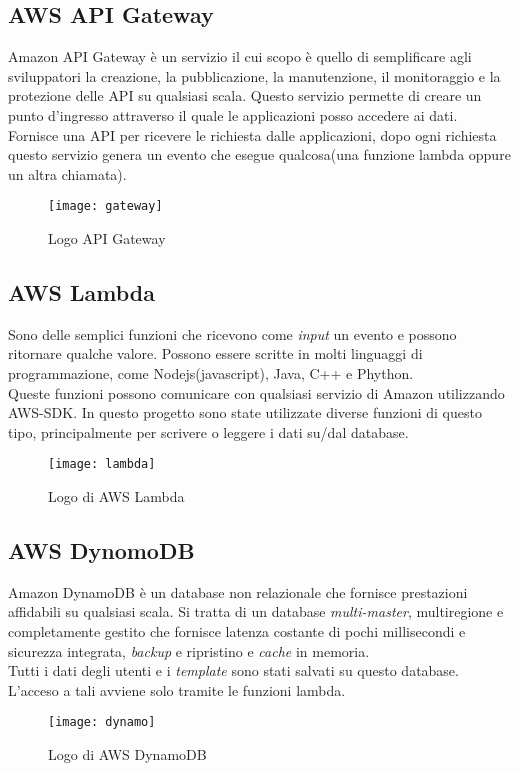 \subsection{AWS API Gateway} Amazon API Gateway è un servizio il cui scopo è quello di semplificare agli sviluppatori
la creazione, la pubblicazione, la manutenzione, il monitoraggio e la protezione
delle \gls{API} su qualsiasi scala.
Questo servizio permette di creare un punto d'ingresso attraverso il quale le applicazioni posso accedere ai dati. Fornisce una API per ricevere le richiesta dalle applicazioni, dopo ogni richiesta questo servizio genera un evento che esegue qualcosa(una funzione lambda oppure un altra chiamata).
\begin{figure}[!h] 
	\centering 
	\texttt{[image: gateway]}
	\caption{Logo API Gateway}
\end{figure}

\subsection{AWS Lambda} 

Sono delle semplici funzioni che ricevono come \emph{input} un evento e possono ritornare qualche valore. Possono essere scritte in molti linguaggi di programmazione, come Nodejs(javascript), Java, C++ e Phython. 
\\

Queste funzioni possono comunicare con qualsiasi servizio di Amazon utilizzando AWS-\gls{SDK}. In questo progetto sono state utilizzate diverse funzioni di questo tipo, principalmente per scrivere o leggere i dati su/dal database.
\begin{figure}[!h] 
	\centering 
	\texttt{[image: lambda]}
	\caption{Logo di AWS Lambda}
\end{figure}  

\subsection{AWS DynomoDB} 
Amazon DynamoDB è un database non relazionale che fornisce prestazioni affidabili su qualsiasi scala. Si tratta di un database \emph{multi-master}, multiregione e completamente gestito che fornisce latenza costante di pochi millisecondi e sicurezza integrata, \emph{backup} e ripristino e \emph{cache} in memoria.
\\

Tutti i dati degli utenti e i \emph{template} sono stati salvati su questo database. L'acceso a tali avviene solo tramite le funzioni lambda.   
\begin{figure}[!h] 
	\centering 
	\texttt{[image: dynamo]}
	\caption{Logo di AWS DynamoDB}
\end{figure}


